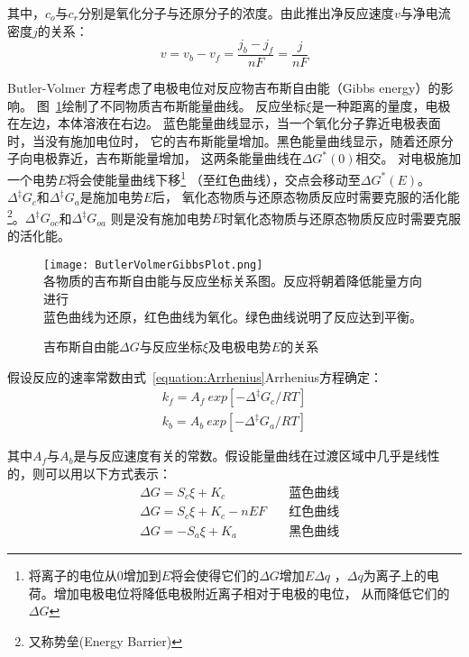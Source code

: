 其中，$c_o$与$c_r$分别是氧化分子与还原分子的浓度。由此推出净反应速度$v$与净电流密度$j$的关系：
\begin{equation}
    v=v_b-v_f=\frac{j_b-j_f}{nF}=\frac{j}{nF}
\end{equation}

Butler-Volmer 方程考虑了电极电位对反应物吉布斯自由能（Gibbs energy）的影响。
图~\ref{fig:ButlerVolmerGibbsPlot}绘制了不同物质吉布斯能量曲线。
反应坐标$\xi$是一种距离的量度，电极在左边，本体溶液在右边。
蓝色能量曲线显示，当一个氧化分子靠近电极表面时，当没有施加电位时，
它的吉布斯能量增加。黑色能量曲线显示，随着还原分子向电极靠近，吉布斯能量增加，
这两条能量曲线在$\Delta G^{*}(0)$相交。
对电极施加一个电势$E$将会使能量曲线下移\footnote{
    将离子的电位从$0$增加到$E$将会使得它们的$\Delta G$增加$E\Delta q$
    ，$\Delta q$为离子上的电荷。增加电极电位将降低电极附近离子相对于电极的电位，
    从而降低它们的$\Delta G$
}
（至红色曲线），交点会移动至$\Delta G^{*}(E)$。
$\Delta ^{\ddagger }G_{c}$和$\Delta ^{\ddagger }G_{a}$是施加电势$E$后，
氧化态物质与还原态物质反应时需要克服的活化能\footnote{又称势垒(Energy Barrier)}。$\Delta ^{\ddagger }G_{oc}$和$\Delta ^{\ddagger }G_{oa}$
则是没有施加电势$E$时氧化态物质与还原态物质反应时需要克服的活化能\cite{CITEREFNewmanThomas-Alyea2004}。
\begin{figure}[H]
    \centering
    \texttt{[image: ButlerVolmerGibbsPlot.png]}\\
    各物质的吉布斯自由能与反应坐标关系图。反应将朝着降低能量方向进行\\
    蓝色曲线为还原，红色曲线为氧化。绿色曲线说明了反应达到平衡。
    \caption{吉布斯自由能$\Delta G$与反应坐标$\xi$及电极电势$E$的关系\cite{Gibbs}}
    \label{fig:ButlerVolmerGibbsPlot}
\end{figure}

假设反应的速率常数由式~\ref{equation:Arrhenius}Arrhenius方程确定：
\begin{equation}
    \begin{aligned}
        k_ {f} = A_ {f} \ exp [-\Delta ^ {\ddagger} G_ {c} / RT]\\
        k_ {b} = A_ {b} \ exp [-\Delta ^ {\ddagger} G_ {a} / RT]%
    \end{aligned}
\end{equation}

其中$A_ {f}$与$A_ {b}$是与反应速度有关的常数。假设能量曲线在过渡区域中几乎是线性的，则可以用以下方式表示：
\begin{equation}
    \begin{aligned}
        &\Delta G = S_{c} \xi + K_{c} & \mbox{蓝色曲线}\\
        &\Delta G = S_{c} \xi + K_{c} -nEF \quad &\mbox{红色曲线}\\
        &\Delta G =- S_{a} \xi + K_{a} \quad &\mbox{黑色曲线}
    \end{aligned}
\end{equation}

